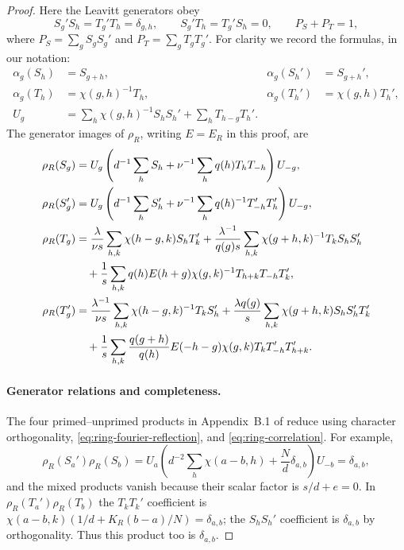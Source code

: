 \documentclass[11pt]{article}
\theoremstyle{remark}
\begin{document}
\begin{proof}
Here the Leavitt generators obey
\[
 S_g'S_h=T_g'T_h=\delta_{g,h},\qquad S_g'T_h=T_g'S_h=0,\qquad
 P_S+P_T=1,
\]
where $P_S=\sum_gS_gS_g'$ and $P_T=\sum_gT_gT_g'$.
For clarity we record the formulas, in our notation:
\begin{align*}
 \alpha_g(S_h)&=S_{g+h},& \alpha_g(S_h')&=S_{g+h}',\\
 \alpha_g(T_h)&=\chi(g,h)^{-1}T_h,&
 \alpha_g(T_h')&=\chi(g,h)T_h',\\
 U_g&=\sum_h\chi(g,h)^{-1}S_hS_h'+\sum_hT_{h-g}T_h'.
\end{align*}
The generator images of $\rho_R$, writing $E=E_R$ in this proof, are
\begin{align}
 \rho_R(S_g)&=U_g\left(d^{-1}\sum_hS_h+
                    \nu^{-1}\sum_hq(h)T_hT_{-h}\right)U_{-g},\notag\\
 \rho_R(S_g')&=U_g\left(d^{-1}\sum_hS_h'+
                    \nu^{-1}\sum_hq(h)^{-1}T_{-h}'T_h'\right)U_{-g},
 \label{eq:ring-rho-S}\\
 \rho_R(T_g)&=\frac{\lambda}{\nu s}\sum_{h,k}\chi(h-g,k)S_hT_k'
 +\frac{\lambda^{-1}}{q(g)s}\sum_{h,k}\chi(g+h,k)^{-1}T_kS_hS_h'
 \notag\\
 &\quad+\frac1s\sum_{h,k}q(h)E(h+g)\chi(g,k)^{-1}T_{h+k}T_{-h}T_k',
 \label{eq:ring-rho-T}\\
 \rho_R(T_g')&=\frac{\lambda^{-1}}{\nu s}\sum_{h,k}\chi(h-g,k)^{-1}T_kS_h'
 +\frac{\lambda q(g)}s\sum_{h,k}\chi(g+h,k)S_hS_h'T_k'
 \notag\\
 &\quad+\frac1s\sum_{h,k}\frac{q(g+h)}{q(h)}E(-h-g)\chi(g,k)
                    T_kT_{-h}'T_{h+k}'.\label{eq:ring-rho-Tprime}
\end{align}

\paragraph{Generator relations and completeness.}
The four primed--unprimed products in Appendix~B.1 of \cite{RW2} reduce
using character orthogonality, \eqref{eq:ring-fourier-reflection}, and
\eqref{eq:ring-correlation}. For example,
\[
 \rho_R(S_a')\rho_R(S_b)
 =U_a\left(d^{-2}\sum_h\chi(a-b,h)+\frac Nd\delta_{a,b}\right)U_{-b}
 =\delta_{a,b},
\]
and the mixed products vanish because their scalar factor is
$s/d+e=0$. In $\rho_R(T_a')\rho_R(T_b)$ the $T_kT_k'$ coefficient
is $\chi(a-b,k)(1/d+K_R(b-a)/N)=\delta_{a,b}$; the
$S_hS_h'$ coefficient is $\delta_{a,b}$ by orthogonality. Thus this
product too is $\delta_{a,b}$.


\end{proof}
\end{document}
